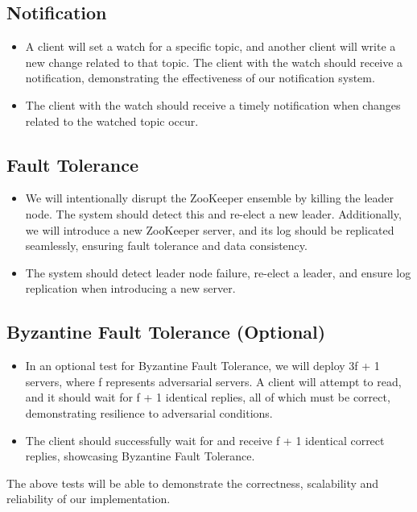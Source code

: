 \documentclass[
course = 50.041,
assignmenttype = {{Jaguard}},
assignment = {{}},
name = {{Group 5}},
studentnumber = {{Report}}
]{style}
\begin{document}
\subsection{Notification}
\begin{itemize}
    \item A client will set a watch for a specific topic, and another client will write a new change related to that topic. The client with the watch should receive a notification, demonstrating the effectiveness of our notification system.
    \item The client with the watch should receive a timely notification when changes related to the watched topic occur.
\end{itemize}

\subsection{Fault Tolerance}
\begin{itemize}
    \item We will intentionally disrupt the ZooKeeper ensemble by killing the leader node. The system should detect this and re-elect a new leader. Additionally, we will introduce a new ZooKeeper server, and its log should be replicated seamlessly, ensuring fault tolerance and data consistency.
    \item The system should detect leader node failure, re-elect a leader, and ensure log replication when introducing a new server.
\end{itemize}

\subsection{Byzantine Fault Tolerance (Optional)}
\begin{itemize}
    \item In an optional test for Byzantine Fault Tolerance, we will deploy 3f + 1 servers, where f represents adversarial servers. A client will attempt to read, and it should wait for f + 1 identical replies, all of which must be correct, demonstrating resilience to adversarial conditions.
    \item The client should successfully wait for and receive f + 1 identical correct replies, showcasing Byzantine Fault Tolerance.
\end{itemize}

The above tests will be able to demonstrate the correctness, scalability and reliability of our implementation. 
\end{document}
